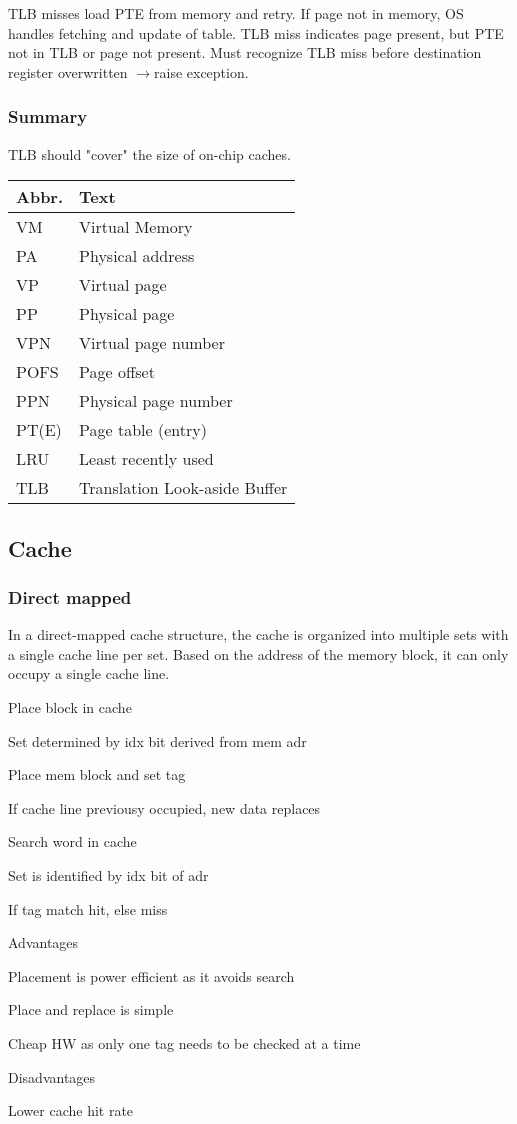 \documentclass[a4paper, fontsize=8pt, landscape, DIV=1]{scrartcl}
\makeatletter
\renewenvironment{outline}[1][]{%
  \ifthenelse{\equal{#1}{}}{}{\renewcommand{\ol@type}{#1}}%
  \ol@z%
  \newcommand{\0}{\ol@toz\ol@z}%
  \newcommand{\1}{\vspace{\dimexpr\outlinespacingscalar\baselineskip-\baselineskip}\ol@toi\ol@i\item}%
  \newcommand{\2}{\vspace{\dimexpr\outlinespacingscalartwo\baselineskip-\baselineskip}\ol@toii\ol@ii\item}%
  \newcommand{\3}{\vspace{\dimexpr\outlinespacingscalar\baselineskip-\baselineskip}\ol@toiii\ol@iii\item}%
  \newcommand{\4}{\vspace{\dimexpr\outlinespacingscalar\baselineskip-\baselineskip}\ol@toiiii\ol@iiii\item}%
}{%
  \ol@toz\ol@exit%
}
\def\outlinespacingscalar{0.5}
\def\outlinespacingscalartwo{0.5}
\makeatother
\begin{document}
\begin{multicols*}{4}
  TLB misses load PTE from memory and retry. If page not in memory, OS handles fetching and update
  of table. TLB miss indicates page present, but PTE not in TLB or page not present. Must recognize TLB
  miss before destination register overwritten $\to$raise exception.

  \subsubsection{Summary}
  TLB should "cover" the size of on-chip caches.
   \begin{tabularx}{\linewidth}{l X}
    \hline
    Abbr. & Text \\ \hline
    VM & Virtual Memory \\
    PA & Physical address \\
    VP & Virtual page \\
    PP & Physical page \\
    VPN & Virtual page number \\
    POFS & Page offset \\
    PPN & Physical page number \\
    PT(E) & Page table (entry)\\
    LRU & Least recently used \\
    TLB & Translation Look-aside Buffer\\
    \hline
  \end{tabularx}

  \vfill\null
  \columnbreak
  \subsection{Cache}
  \subsubsection{Direct mapped}
  In a direct-mapped cache structure, the cache is organized into multiple sets with a single 
  cache line per set. Based on the address of the memory block, it can only occupy a single cache 
  line.
  \begin{outline}
    \1 Place block in cache
      \2 Set determined by idx bit derived from mem adr
      \2 Place mem block and set tag
      \2 If cache line previousy occupied, new data replaces
    \1 Search word in cache
      \2 Set is identified by idx bit of adr
      \2 If tag match hit, else miss
    \1 Advantages
      \2 Placement is power efficient as it avoids search
      \2 Place and replace is simple
      \2 Cheap HW as only one tag needs to be checked at a time
    \1 Disadvantages
      \2 Lower cache hit rate
  \end{outline}


\end{multicols*}
\end{document}
